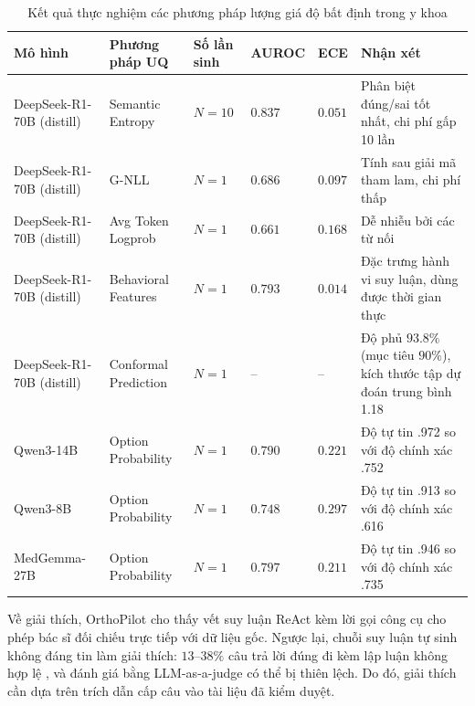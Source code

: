\begin{table}[H]
\begin{singlespace}
\centering
\fontsize{7.5pt}{9.2pt}\selectfont
\setlength{\tabcolsep}{2.5pt}
\renewcommand{\arraystretch}{1.1}
\begin{tabularx}{\textwidth}{|>{\raggedright\arraybackslash}p{2.6cm}|>{\raggedright\arraybackslash}p{2.3cm}|>{\centering\arraybackslash}p{1.4cm}|>{\centering\arraybackslash}p{1.2cm}|>{\centering\arraybackslash}p{1.2cm}|>{\raggedright\arraybackslash}X|}
\hline
\textbf{Mô hình} & \textbf{Phương pháp UQ} & \textbf{Số lần sinh} & \textbf{AUROC} & \textbf{ECE} & \textbf{Nhận xét} \\
\hline
DeepSeek-R1-70B (distill) & Semantic Entropy & $N=10$ & $\mathbf{0.837}$ & $0.051$ & Phân biệt đúng/sai tốt nhất, chi phí gấp 10 lần \cite{mind_the_gap_2026} \\
\hline
DeepSeek-R1-70B (distill) & G-NLL & $N=1$ & $0.686$ & $0.097$ & Tính sau giải mã tham lam, chi phí thấp \cite{mind_the_gap_2026} \\
\hline
DeepSeek-R1-70B (distill) & Avg Token Logprob & $N=1$ & $0.661$ & $0.168$ & Dễ nhiễu bởi các từ nối \cite{mind_the_gap_2026} \\
\hline
DeepSeek-R1-70B (distill) & Behavioral Features & $N=1$ & $0.793$ & $\mathbf{0.014}$ & Đặc trưng hành vi suy luận, dùng được thời gian thực \cite{mind_the_gap_2026} \\
\hline
DeepSeek-R1-70B (distill) & Conformal Prediction & $N=1$ & -- & -- & Độ phủ $93.8\%$ (mục tiêu $90\%$), kích thước tập dự đoán trung bình 1.18 \\
\hline
Qwen3-14B & Option Probability & $N=1$ & $0.790$ & $0.221$ & Độ tự tin .972 so với độ chính xác .752 \cite{spanish_mir_2026} \\
\hline
Qwen3-8B & Option Probability & $N=1$ & $0.748$ & $0.297$ & Độ tự tin .913 so với độ chính xác .616 \cite{spanish_mir_2026} \\
\hline
MedGemma-27B & Option Probability & $N=1$ & $0.797$ & $0.211$ & Độ tự tin .946 so với độ chính xác .735 \cite{spanish_mir_2026} \\
\hline
\end{tabularx}
\caption{Kết quả thực nghiệm các phương pháp lượng giá độ bất định trong y khoa}
\label{tab:uq_detailed_comparison}
\end{singlespace}
\end{table}

Về giải thích, OrthoPilot \cite{orthopilot_2026} cho thấy vết suy luận ReAct kèm lời gọi công cụ cho phép bác sĩ đối chiếu trực tiếp với dữ liệu gốc. Ngược lại, chuỗi suy luận tự sinh không đáng tin làm giải thích: $13$--$38\%$ câu trả lời đúng đi kèm lập luận không hợp lệ \cite{spanish_mir_2026}, và đánh giá bằng LLM-as-a-judge có thể bị thiên lệch. Do đó, giải thích cần dựa trên trích dẫn cấp câu vào tài liệu đã kiểm duyệt.

